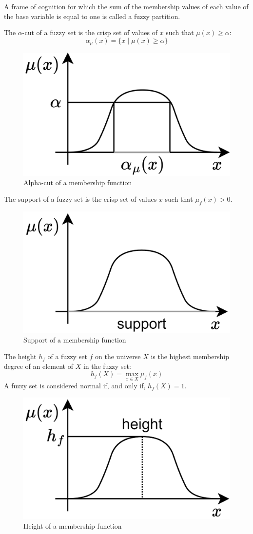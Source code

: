 \begin{definition}
    A frame of cognition for which the sum of the membership values of each value of the base variable is equal to one is called a fuzzy partition.
\end{definition}
\begin{definition}
    The $\alpha$-cut of a fuzzy set is the crisp set of values of $x$ such that $\mu(x) \geq \alpha$:
    \[\alpha_\mu(x)=\{x \mid \mu(x) \geq \alpha\}\]
\end{definition}
\begin{figure}[H]
    \centering
    \includegraphics[width=0.3\linewidth]{images/alpha.png}
    \caption{Alpha-cut of a membership function}
\end{figure}
\begin{definition}
    The support of a fuzzy set is the crisp set of values $x$ such that $\mu_f(x)>0$. 
\end{definition}
\begin{figure}[H]
    \centering
    \includegraphics[width=0.3\linewidth]{images/support.png}
    \caption{Support of a membership function}
\end{figure}
\begin{definition}
    The height $h_f$ of a fuzzy set $f$ on the universe $X$ is the highest membership degree of an element of $X$ in the fuzzy set:
    \[h_f(X)=\max_{x \in X}\mu_f(x)\]
    A fuzzy set is considered normal if, and only if, $h_f(X)=1$.
\end{definition}
\begin{figure}[H]
    \centering
    \includegraphics[width=0.3\linewidth]{images/height.png}
    \caption{Height of a membership function}
\end{figure}
